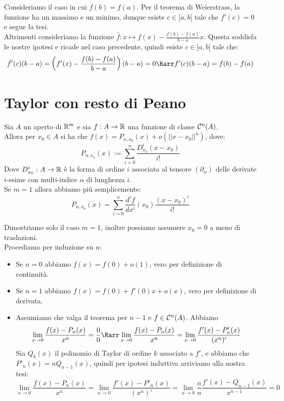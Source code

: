 \documentclass[openany]{book}
\begin{document}
    Consideriamo il caso in cui $f(b)=f(a)$. Per il teorema di Weierstrass, la funzione ha un massimo e un minimo, dunque esiste $c \in ]a,b[$ tale che $f'(c) = 0$ e segue la tesi.\\
    Altrimenti consideriamo la funzione $\hat{f} : x \mapsto f(x) - \frac{f(b)-f(a)}{b-a}x$. Questa soddisfa le nostre ipotesi e ricade nel caso precedente, quindi esiste $c \in ]a,b[$ tale che:
    \[\hat{f}'(c)(b-a) = \left(f'(x) - \frac{f(b)-f(a)}{b-a}\right)(b-a)=0 \Rarr f'(c)(b-a) = f(b)-f(a)\]


\section{Taylor con resto di Peano}
\begin{theorem}{}{}
    Sia $A$ un aperto di $\mathbb{R}^m$ e sia  $f: A \to \mathbb{R}$ una funzione di classe $\mathcal{C}^n(A)$.\\
    Allora per $x_0 \in A$ si ha che $f(x) = P_{n,x_0}(x) + o(||x-x_0||^n)$, dove:
    \[P_{n,x_o}(x) := \sum_{i=0}^{n} \frac{D^i_{x_0}(x-x_0)}{i!}\]
    Dove $D^i_{x_0} : A\to\mathbb{R}$ è la forma di ordine $i$ associata al tensore $(\partial_\alpha)$ delle derivate $i$-esime con multi-indice $\alpha$ di lunghezza $i$.\\
    Se $m=1$ allora abbiamo più semplicemente:
    \[P_{n,x_0}(x) = \sum_{i=0}^{n}\frac{d^if}{dx^i} (x_0) \frac{(x-x_0)^i}{i!}\]
\end{theorem}

    Dimostriamo solo il caso $m=1$, inoltre possiamo assumere $x_0=0$ a meno di traslazioni.\\
    Procediamo per induzione su $n$:\begin{itemize}
        \item Se $n=0$ abbiamo $f(x)=f(0) + o(1)$, vero per definizione di continuità.
        \item Se $n=1$ abbiamo $f(x) = f(0) + f'(0)x + o(x)$, vero per definizione di derivata.
        \item Assumiamo che valga il teorema per $n-1$ e $f \in \mathcal{C}^n(A)$. Abbiamo
        \[\lim_{x\to 0}\frac{f(x)- P_{n}(x)}{x^n} = \frac{0}{0} \Rarr \lim_{x\to 0}\frac{f(x)- P_{n}(x)}{x^n} = \lim_{x\to 0}\frac{f'(x)- P'_{n}(x)}{(x^n)'}\]
        Sia $Q_k(x)$ il polinomio di Taylor di ordine $k$ associato a $f'$, e abbiamo che $P'_n(x) = nQ_{n-1}(x)$, quindi per ipotesi induttiva arriviamo alla nostra tesi:
        \[\lim_{x\to 0}\frac{f(x)- P_{n}(x)}{x^n} = \lim_{x\to 0}\frac{f'(x)- P'_{n}(x)}{(x^n)'} = \lim_{x\to 0} \frac{n}{n}\frac{f'(x)-Q_{n-1}(x)}{x^{n-1}} = 0\]
    \end{itemize}
\end{document}

